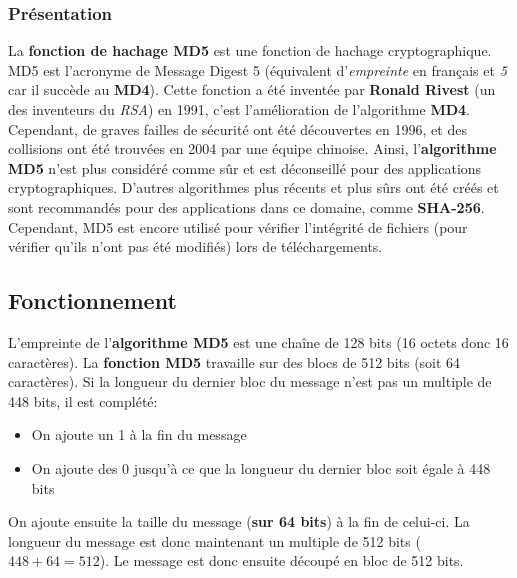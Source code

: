 \documentclass[12pt, a4paper]{article}
\begin{document}
\subsubsection*{Présentation}\label{md5_presentation}

La \textbf{fonction de hachage MD5} est une fonction de hachage cryptographique.
MD5 est l'acronyme de Message Digest 5 (équivalent d'\textit{empreinte} en français et \textit{5} car il succède au \textbf{MD4}).
Cette fonction a été inventée par \textbf{Ronald Rivest} (un des inventeurs du \textit{RSA}) en 1991,
c'est l'amélioration de l'algorithme \textbf{MD4}.
Cependant, de graves failles de sécurité ont été découvertes en 1996,
et des collisions ont été trouvées en 2004 par une équipe chinoise.
Ainsi, l'\textbf{algorithme MD5} n'est plus considéré comme sûr et est déconseillé pour des applications cryptographiques.
D'autres algorithmes plus récents et plus sûrs ont été créés et sont recommandés pour des applications dans ce domaine,
comme \textbf{SHA-256}.
Cependant, MD5 est encore utilisé pour vérifier l'intégrité de fichiers (pour vérifier qu'ils n'ont pas été modifiés)
lors de téléchargements.

\subsection*{Fonctionnement}

L'empreinte de l'\textbf{algorithme MD5} est une chaîne de 128 bits (16 octets donc 16 caractères).
La \textbf{fonction MD5} travaille sur des blocs de 512 bits (soit 64 caractères).
Si la longueur du dernier bloc du message n'est pas un multiple de 448 bits, il est complété:
\begin{itemize}
    \item On ajoute un 1 à la fin du message
    \item On ajoute des 0 jusqu'à ce que la longueur du dernier bloc soit égale à 448 bits
\end{itemize}
\bigskip
On ajoute ensuite la taille du message (\textbf{sur 64 bits}) à la fin de celui-ci.
La longueur du message est donc maintenant un multiple de 512 bits ($448 + 64 = 512$).
Le message est donc ensuite découpé en bloc de 512 bits.
\end{document}

